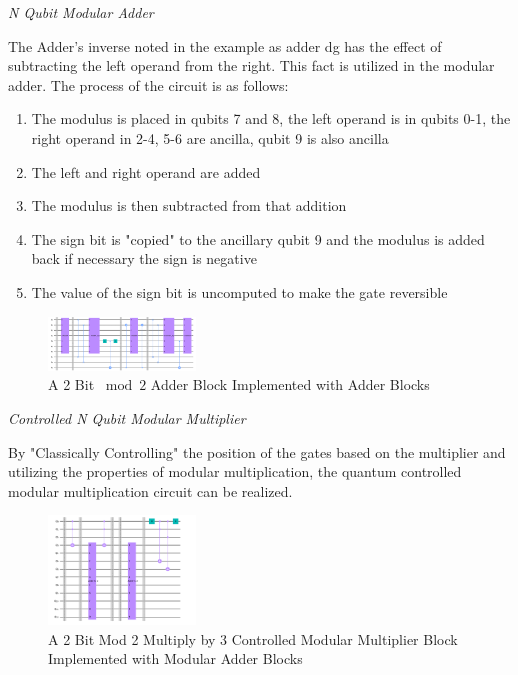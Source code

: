 \documentclass[journal]{IEEEtran}
\begin{document}
\emph{N Qubit Modular Adder}

The Adder's inverse noted in the example as adder dg has the effect of
subtracting the left operand from the right. This fact is utilized in the
modular adder.  The process of the circuit is as follows:

\begin{enumerate}
    \item The modulus is placed in qubits 7 and 8, the left operand is in qubits 0-1, the right operand in 2-4, 5-6 are ancilla, qubit 9  is also ancilla
    \item The left and right operand are added
    \item The modulus is then subtracted from that addition
    \item The sign bit is "copied" to the ancillary qubit 9 and the modulus is added back if necessary the sign is negative
    \item The value of the sign bit is uncomputed to make the gate reversible
\end{enumerate}

\begin{figure}[H]
    \begin{center}
        \includegraphics[width=0.35\textwidth]{ModAdder.png}
        \caption{\label{fig:ModAdder} A 2 Bit \(\bmod 2\) Adder Block Implemented with Adder Blocks }
    \end{center}
\end{figure}

\emph{Controlled N Qubit Modular Multiplier}

By "Classically Controlling" the position of the gates based on the multiplier
and utilizing the properties of modular multiplication, the quantum controlled
modular multiplication circuit can be realized.

\begin{figure}[H]
    \begin{center}
        \includegraphics[width=0.35\textwidth]{CModMult.png}
        \caption{\label{fig:CModMult} A 2 Bit Mod 2 Multiply by 3 Controlled
            Modular Multiplier Block Implemented with Modular Adder Blocks }
    \end{center}
\end{figure}
\end{document}
